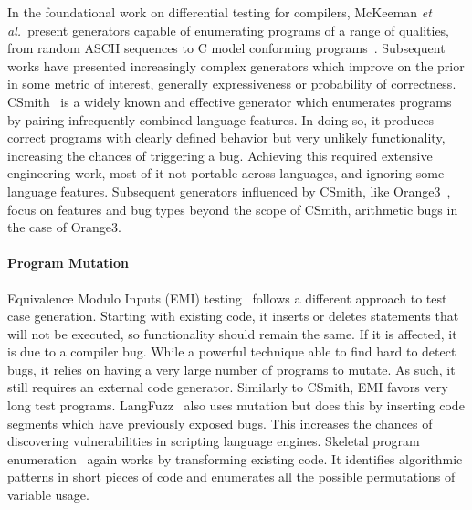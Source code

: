 In the foundational work on differential testing for compilers, McKeeman \emph{et al.\ }present generators capable of enumerating programs of a range of qualities, from random ASCII sequences to C model conforming programs~\cite{McKeeman1998}. Subsequent works have presented increasingly complex generators which improve on the prior in some metric of interest, generally expressiveness or probability of correctness. CSmith~\cite{Yang2011} is a widely known and effective generator which enumerates programs by pairing infrequently combined language features. In doing so, it produces correct programs with clearly defined behavior but very unlikely functionality, increasing the chances of triggering a bug. Achieving this required extensive engineering work, most of it not portable across languages, and ignoring some language features. Subsequent generators influenced by CSmith, like Orange3~\cite{Nagai2013}, focus on features and bug types beyond the scope of CSmith, arithmetic bugs in the case of Orange3.

\paragraph{Program Mutation}

Equivalence Modulo Inputs (EMI) testing~\cite{Le2013a,Sun2016a} follows a different approach to test case generation. Starting with existing code, it inserts or deletes statements that will not be executed, so functionality should remain the same. If it is affected, it is due to a compiler bug. While a powerful technique able to find hard to detect bugs, it relies on having a very large number of programs to mutate. As such, it still requires an external code generator. Similarly to CSmith, EMI favors very long test programs. LangFuzz~\cite{Holler2012} also uses mutation but does this by inserting code segments which have previously exposed bugs. This increases the chances of discovering vulnerabilities in scripting language engines.
Skeletal program enumeration~\cite{Zhang2017a} again works by transforming existing code. It identifies algorithmic patterns in short pieces of code and enumerates all the possible permutations of variable usage.

